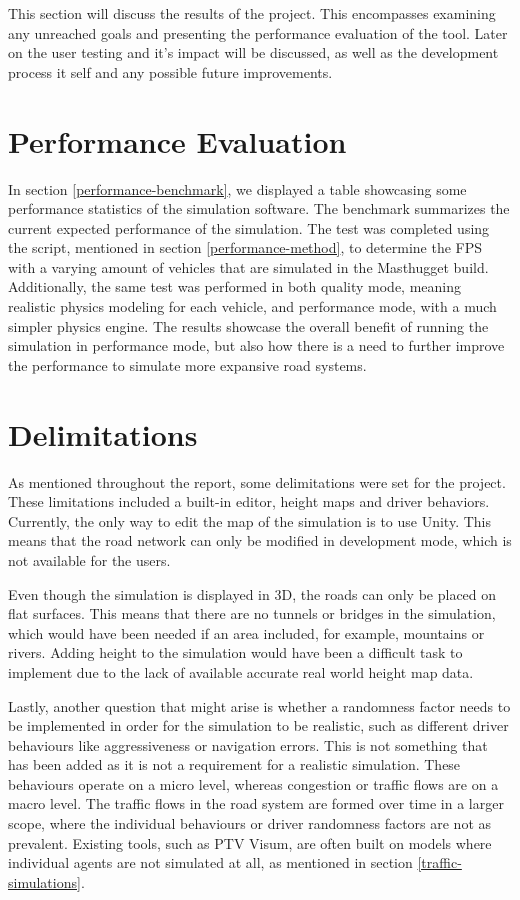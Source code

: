 
This section will discuss the results of the project. This encompasses examining any unreached goals and presenting the performance evaluation of the tool. Later on the user testing and it's impact will be discussed, as well as the development process it self and any possible future improvements.

\section{Performance Evaluation}
    In section \ref{performance-benchmark}, we displayed a table showcasing some performance statistics of the simulation software. The benchmark summarizes the current expected performance of the simulation. The test was completed using the script, mentioned in section \ref{performance-method}, to determine the FPS with a varying amount of vehicles that are simulated in the Masthugget build. Additionally, the same test was performed in both quality mode, meaning realistic physics modeling for each vehicle, and performance mode, with a much simpler physics engine. The results showcase the overall benefit of running the simulation in performance mode, but also how there is a need to further improve the performance to simulate more expansive road systems.

\section{Delimitations}
    As mentioned throughout the report, some delimitations were set for the project. These limitations included a built-in editor, height maps and driver behaviors. Currently, the only way to edit the map of the simulation is to use Unity. This means that the road network can only be modified in development mode, which is not available for the users.

    Even though the simulation is displayed in 3D, the roads can only be placed on flat surfaces. This means that there are no tunnels or bridges in the simulation, which would have been needed if an area included, for example, mountains or rivers. Adding height to the simulation would have been a difficult task to implement due to the lack of available accurate real world height map data.

    Lastly, another question that might arise is whether a randomness factor needs to be implemented in order for the simulation to be realistic, such as different driver behaviours like aggressiveness or navigation errors. This is not something that has been added as it is not a requirement for a realistic simulation. These behaviours operate on a micro level, whereas congestion or traffic flows are on a macro level. The traffic flows in the road system are formed over time in a larger scope, where the individual behaviours or driver randomness factors are not as prevalent. Existing tools, such as PTV Visum, are often built on models where individual agents are not simulated at all, as mentioned in section \ref{traffic-simulations}.

